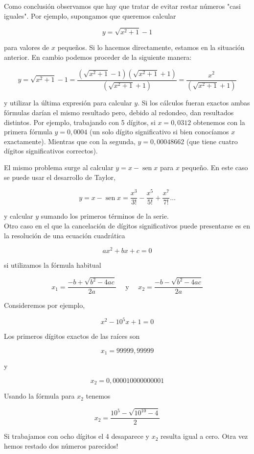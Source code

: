 \documentclass[10pt]{book}
\begin{document}
Como conclusión observamos que hay que tratar de evitar restar números "casi iguales". Por ejemplo, supongamos que queremos calcular

$$
y=\sqrt{x^{2}+1}-1
$$

para valores de $x$ pequeños. Si lo hacemos directamente, estamos en la situación anterior. En cambio podemos proceder de la siguiente manera:

$$
y=\sqrt{x^{2}+1}-1=\frac{\left(\sqrt{x^{2}+1}-1\right)\left(\sqrt{x^{2}+1}+1\right)}{\left(\sqrt{x^{2}+1}+1\right)}=\frac{x^{2}}{\left(\sqrt{x^{2}+1}+1\right)}
$$

y utilizar la última expresión para calcular $y$. Si los cálculos fueran exactos ambas fórmulas darían el mismo resultado pero, debido al redondeo, dan resultados distintos. Por ejemplo, trabajando con 5 dígitos, si $x=0,0312$ obtenemos con la primera fórmula $y=0,0004$ (un solo dígito significativo si bien conocíamos $x$ exactamente). Mientras que con la segunda, $y=0,00048662$ (que tiene cuatro dígitos significativos correctos).

El mismo problema surge al calcular $y=x-\operatorname{sen} x$ para $x$ pequeño. En este caso se puede usar el desarrollo de Taylor,

$$
y=x-\operatorname{sen} x=\frac{x^{3}}{3!}-\frac{x^{5}}{5!}+\frac{x^{7}}{7!} \ldots
$$

y calcular $y$ sumando los primeros términos de la serie.\\
Otro caso en el que la cancelación de dígitos significativos puede presentarse es en la resolución de una ecuación cuadrática

$$
a x^{2}+b x+c=0
$$

si utilizamos la fórmula habitual

$$
x_{1}=\frac{-b+\sqrt{b^{2}-4 a c}}{2 a} \quad \text { y } \quad x_{2}=\frac{-b-\sqrt{b^{2}-4 a c}}{2 a}
$$

Consideremos por ejemplo,

$$
x^{2}-10^{5} x+1=0
$$

Los primeros dígitos exactos de las raíces son

$$
x_{1}=99999,99999
$$

y

$$
x_{2}=0,000010000000001
$$

Usando la fórmula para $x_{2}$ tenemos

$$
x_{2}=\frac{10^{5}-\sqrt{10^{10}-4}}{2}
$$

Si trabajamos con ocho dígitos el 4 desaparece y $x_{2}$ resulta igual a cero. Otra vez hemos restado dos números parecidos!
\end{document}
